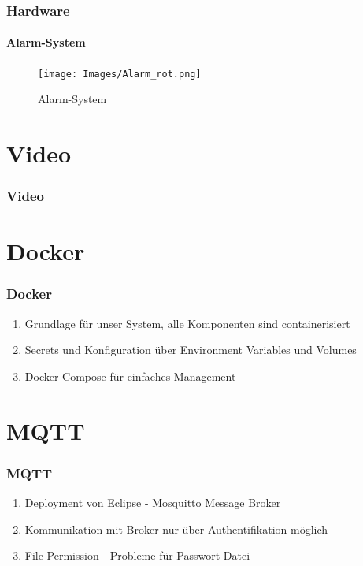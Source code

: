 \documentclass[aspectratio=169]{beamer}
\begin{document}
\begin{frame}
	\frametitle{Hardware}
	\framesubtitle{Alarm-System}
	\begin{figure}
		\centering
		\begin{minipage}[t]{1\textwidth}
			\centering
			\texttt{[image: Images/Alarm\_rot.png]}
		\end{minipage}
		\caption{Alarm-System}
		\label{fig:slarm_system}
	\end{figure}
\end{frame}

\section{Video}

\begin{frame}
	\frametitle{Video}
	\begin{center}
	\end{center}
\end{frame}

\section{Docker}
\begin{frame}
	\frametitle{Docker}
	\begin{enumerate}
		\item Grundlage für unser System, alle Komponenten sind containerisiert
		\item Secrets und Konfiguration über Environment Variables und Volumes
		\item Docker Compose für einfaches Management
	\end{enumerate}
\end{frame}


\section{MQTT}
\begin{frame}
	\frametitle{MQTT}
	\begin{enumerate}
    \item Deployment von Eclipse - Mosquitto Message Broker 
    \item Kommunikation mit Broker nur über Authentifikation möglich
    \item File-Permission - Probleme für Passwort-Datei 
	\end{enumerate}
\end{frame}
\end{document}
